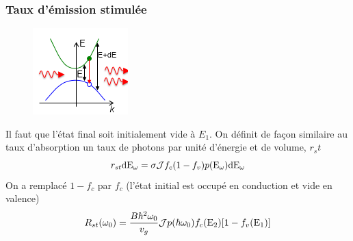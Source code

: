 		\subsubsection{Taux d'émission stimulée}
		\begin{figure}
		\vspace{-5mm}
		\includegraphics[scale=0.85]{ch5/image19}
		\end{figure}		 
		Il faut que l'état final soit initialement vide à $E_1$. On définit de façon similaire au 
		taux d'absorption un taux de photons par unité d'énergie et de volume, $r_st$
		\begin{equation}
		{r_{st}}{\rm{d}}{{\rm{E}}_\omega } = \sigma {{\cal J}}{f_c}(1 - {f_v})p({{\rm{E}}_\omega
		 }){\rm{d}}{{\rm{E}}_\omega }
		\end{equation}
		On a remplacé $1-f_c$ par $f_c$ (l'état initial est occupé en conduction et vide en valence) 
		\begin{equation}
		{R_{st}}({\omega _0}) = \frac{{B{\hbar ^2}{\omega _0}}}{{{v_g}}}{{\cal J}}p(\hbar
		{\omega _0}){f_c}({{\rm{E}}_2})[1 - {f_v}({{\rm{E}}_{\rm{1}}})]
		\end{equation}				
		
